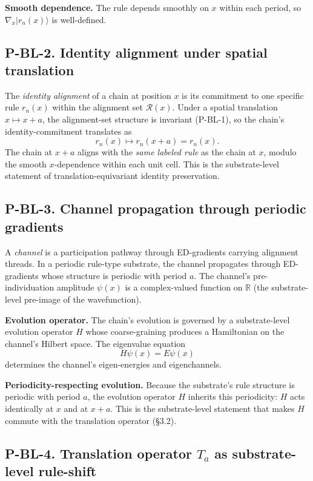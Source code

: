 \documentclass[11pt,a4paper]{article}
\begin{document}
\textbf{Smooth dependence.} The rule depends smoothly on $x$ within each period, so $\nabla_x|r_n(x)\rangle$ is well-defined.

\subsection{P-BL-2. Identity alignment under spatial translation}

The \emph{identity alignment} of a chain at position $x$ is its commitment to one specific rule $r_n(x)$ within the alignment set $\mathcal{R}(x)$. Under a spatial translation $x \mapsto x + a$, the alignment-set structure is invariant (P-BL-1), so the chain's identity-commitment translates as
\[
r_n(x) \mapsto r_n(x + a) = r_n(x).
\]
The chain at $x + a$ aligns with the \emph{same labeled rule} as the chain at $x$, modulo the smooth $x$-dependence within each unit cell. This is the substrate-level statement of translation-equivariant identity preservation.

\subsection{P-BL-3. Channel propagation through periodic gradients}

A \emph{channel} is a participation pathway through ED-gradients carrying alignment threads. In a periodic rule-type substrate, the channel propagates through ED-gradients whose structure is periodic with period $a$. The channel's pre-individuation amplitude $\psi(x)$ is a complex-valued function on $\mathbb{R}$ (the substrate-level pre-image of the wavefunction).

\textbf{Evolution operator.} The chain's evolution is governed by a substrate-level evolution operator $H$ whose coarse-graining produces a Hamiltonian on the channel's Hilbert space. The eigenvalue equation
\[
H \psi(x) = E \psi(x)
\]
determines the channel's eigen-energies and eigenchannels.

\textbf{Periodicity-respecting evolution.} Because the substrate's rule structure is periodic with period $a$, the evolution operator $H$ inherits this periodicity: $H$ acts identically at $x$ and at $x + a$. This is the substrate-level statement that makes $H$ commute with the translation operator (\S3.2).

\subsection{P-BL-4. Translation operator $T_a$ as substrate-level rule-shift}
\end{document}
